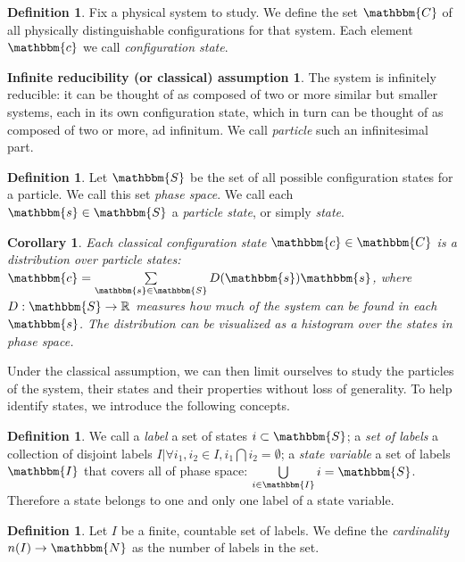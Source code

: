 \documentclass[aps,pra,10pt,twocolumn,floatfix,nofootinbib]{revtex4-1}
\newtheorem{cor}[thm]{Corollary}
\theoremstyle{definition}
\newtheorem{defn}[thm]{Definition}
\newtheorem*{assump1}{Infinite reducibility (or classical) assumption}
\begin{document}
\begin{defn}\label{statedef}
Fix a physical system to study. We define the set $\mathbbm{C}$ of all physically distinguishable configurations for that system. Each element $\mathbbm{c}$ we call \emph{configuration state}.
\end{defn}

\begin{assump1}\label{classical}
The system is infinitely reducible: it can be thought of as composed of two or more similar but smaller systems, each in its own configuration state, which in turn can be thought of as composed of two or more, ad infinitum. We call \emph{particle} such an infinitesimal part.
\end{assump1}

\begin{defn}\label{classicalPhaseSpace}
Let $\mathbbm{S}$ be the set of all possible configuration states for a particle. We call this set \emph{phase space}. We call each $\mathbbm{s} \in \mathbbm{S}$ a \emph{particle state}, or simply \emph{state}.
\end{defn}

\begin{cor}\label{classicalDistribution}
Each classical configuration state $\mathbbm{c} \in \mathbbm{C}$ is a distribution over particle states: $\mathbbm{c}=\sum\limits_{\mathbbm{s} \in \mathbbm{S}} D(\mathbbm{s}) \mathbbm{s}$, where $D:\mathbbm{S}\rightarrow\mathbb{R}$ measures how much of the system can be found in each $\mathbbm{s}$. The distribution can be visualized as a histogram over the states in phase space.
\end{cor}

Under the classical assumption, we can then limit ourselves to study the particles of the system, their states and their properties without loss of generality. To help identify states, we introduce the following concepts.

\begin{defn}\label{label}
We call a \emph{label} a set of states $i\subset\mathbbm{S}$; a \emph{set of labels} a collection of disjoint labels $I | \forall i_1,i_2\in I, i_1\bigcap i_2 = \emptyset$; a \emph{state variable} a set of labels $\mathbbm{I}$ that covers all of phase space: $\bigcup\limits_{i \in \mathbbm{I}}i=\mathbbm{S}$. Therefore a state belongs to one and only one label of a state variable.
\end{defn}

\begin{defn}\label{discreteCardinality}
Let $I$ be a finite, countable set of labels. We define the \emph{cardinality} $n(I) \rightarrow \mathbbm{N}$ as the number of labels in the set.
\end{defn}
\end{document}
